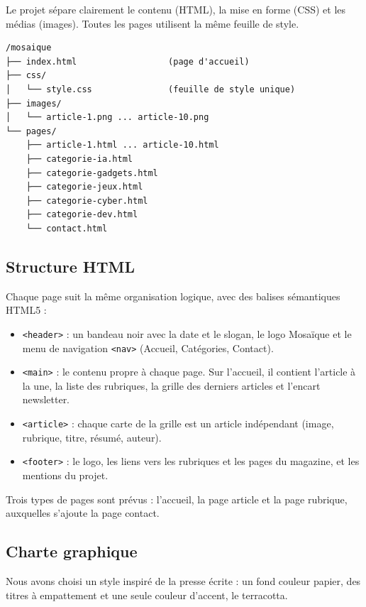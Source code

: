 \documentclass[12pt,a4paper]{article}
\newcommand{\code}[1]{\texttt{#1}}
\begin{document}
Le projet sépare clairement le contenu (HTML), la mise en forme (CSS) et
les médias (images). Toutes les pages utilisent la même feuille de style.

\begin{verbatim}
/mosaique
├── index.html                  (page d'accueil)
├── css/
│   └── style.css               (feuille de style unique)
├── images/
│   └── article-1.png ... article-10.png
└── pages/
    ├── article-1.html ... article-10.html
    ├── categorie-ia.html
    ├── categorie-gadgets.html
    ├── categorie-jeux.html
    ├── categorie-cyber.html
    ├── categorie-dev.html
    └── contact.html
\end{verbatim}

\subsection{Structure HTML}

Chaque page suit la même organisation logique, avec des balises
sémantiques HTML5 :

\begin{itemize}
  \item \code{<header>} : un bandeau noir avec la date et le slogan, le
    logo Mosaïque et le menu de navigation \code{<nav>} (Accueil,
    Catégories, Contact).
  \item \code{<main>} : le contenu propre à chaque page. Sur l'accueil, il
    contient l'article à la une, la liste des rubriques, la grille des
    derniers articles et l'encart newsletter.
  \item \code{<article>} : chaque carte de la grille est un article
    indépendant (image, rubrique, titre, résumé, auteur).
  \item \code{<footer>} : le logo, les liens vers les rubriques et les
    pages du magazine, et les mentions du projet.
\end{itemize}

Trois types de pages sont prévus : l'accueil, la page article et la page
rubrique, auxquelles s'ajoute la page contact.

\subsection{Charte graphique}

Nous avons choisi un style inspiré de la presse écrite : un fond couleur
papier, des titres à empattement et une seule couleur d'accent, le
terracotta.
\end{document}
